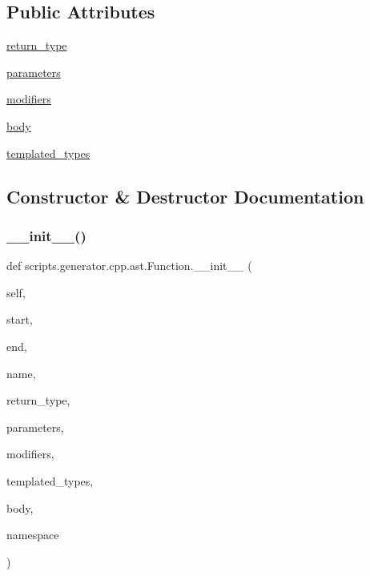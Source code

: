 \subsection*{Public Attributes}
\begin{DoxyCompactItemize}
\item 
\mbox{\hyperlink{classscripts_1_1generator_1_1cpp_1_1ast_1_1_function_a883453721a1ad4500c1103f08ee182ef}{return\+\_\+type}}
\item 
\mbox{\hyperlink{classscripts_1_1generator_1_1cpp_1_1ast_1_1_function_a3722158a9f32403cf0380a5d1ba3f035}{parameters}}
\item 
\mbox{\hyperlink{classscripts_1_1generator_1_1cpp_1_1ast_1_1_function_a2c3d4f1339ae74225cd691707abc669a}{modifiers}}
\item 
\mbox{\hyperlink{classscripts_1_1generator_1_1cpp_1_1ast_1_1_function_a7dbb61df4b5716e8f14d6547b8798a6a}{body}}
\item 
\mbox{\hyperlink{classscripts_1_1generator_1_1cpp_1_1ast_1_1_function_a54dbe525d1ce621370e76e8dc0bacae2}{templated\+\_\+types}}
\end{DoxyCompactItemize}


\subsection{Constructor \& Destructor Documentation}
\mbox{\label{classscripts_1_1generator_1_1cpp_1_1ast_1_1_function_a71d4a01b8cf391120735025d33c9bfcd}} 
\subsubsection{\texorpdfstring{\_\_init\_\_()}{\_\_init\_\_()}}
{\footnotesize\ttfamily def scripts.\+generator.\+cpp.\+ast.\+Function.\+\_\+\+\_\+init\+\_\+\+\_\+ (\begin{DoxyParamCaption}\item[{}]{self,  }\item[{}]{start,  }\item[{}]{end,  }\item[{}]{name,  }\item[{}]{return\+\_\+type,  }\item[{}]{parameters,  }\item[{}]{modifiers,  }\item[{}]{templated\+\_\+types,  }\item[{}]{body,  }\item[{}]{namespace }\end{DoxyParamCaption})}



